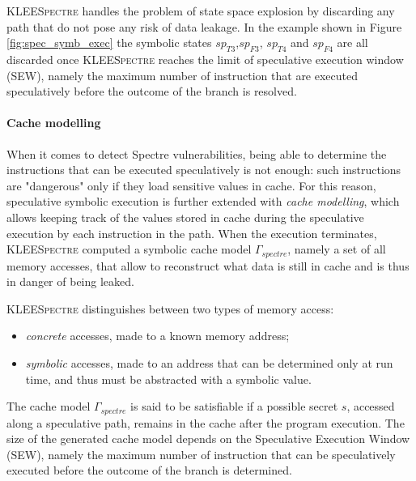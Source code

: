 \documentclass[12pt,a4paper]{book}
\theoremstyle{definition}
\begin{document}
	\textsc{KLEESpectre} handles the problem of state space explosion by discarding any path that do not pose any risk of data leakage. In the example shown in Figure \ref{fig:spec_symb_exec} the symbolic states $sp_{T3}$,$sp_{F3}$, $sp_{T4}$ and $sp_{F4}$ are all discarded once \textsc{KLEESpectre} reaches the limit of speculative execution window (SEW), namely the maximum number of instruction that are executed speculatively before the outcome of the branch is resolved. 
	\paragraph{Cache modelling} 
	When it comes to detect Spectre vulnerabilities, being able to determine the instructions that can be executed speculatively is not enough: such instructions are "dangerous" only if they load sensitive values in cache. For this reason, speculative symbolic execution is further extended with \textit{cache modelling}, which allows keeping track of the values stored in cache during the speculative execution by each instruction in the path. When the execution terminates, \textsc{KLEESpectre} computed a symbolic cache model $\Gamma_{spectre}$, namely a set of all memory accesses, that allow to reconstruct what data is still in cache and is thus in danger of being leaked.
	
	\textsc{KLEESpectre} distinguishes between two types of memory access:
	\begin{itemize}
		\item \textit{concrete} accesses, made to a known memory address;
		\item \textit{symbolic} accesses, made to an address that can be determined only at run time, and thus must be abstracted with a symbolic value. 
	\end{itemize}
	The cache model $\Gamma_{spectre}$ is said to be satisfiable if a possible secret $s$, accessed along a speculative path, remains in the cache after the program execution. The size of the generated cache model depends on the Speculative Execution Window (SEW), namely the maximum number of instruction that can be speculatively executed before the outcome of the branch is determined.
	
\end{document}
